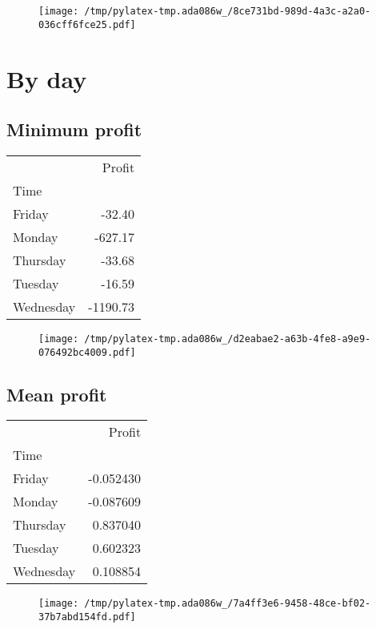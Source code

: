 \documentclass{article}%
\begin{document}
\begin{figure}[htbp]%
\centering%
\texttt{[image: /tmp/pylatex-tmp.ada086w\_/8ce731bd-989d-4a3c-a2a0-036cff6fce25.pdf]}%
\end{figure}

%
\newpage %
\section{By day}%
\label{sec:Byday}%
\subsection{Minimum profit }%
\label{subsec:Minimumprofit}%
\begin{tabular}{lr}
\toprule
{} &   Profit \\
Time      &          \\
\midrule
Friday    &   -32.40 \\
Monday    &  -627.17 \\
Thursday  &   -33.68 \\
Tuesday   &   -16.59 \\
Wednesday & -1190.73 \\
\bottomrule
\end{tabular}
%


\begin{figure}[htbp]%
\centering%
\texttt{[image: /tmp/pylatex-tmp.ada086w\_/d2eabae2-a63b-4fe8-a9e9-076492bc4009.pdf]}%
\end{figure}

%
\newpage %
\subsection{Mean profit }%
\label{subsec:Meanprofit}%
\begin{tabular}{lr}
\toprule
{} &    Profit \\
Time      &           \\
\midrule
Friday    & -0.052430 \\
Monday    & -0.087609 \\
Thursday  &  0.837040 \\
Tuesday   &  0.602323 \\
Wednesday &  0.108854 \\
\bottomrule
\end{tabular}
%


\begin{figure}[htbp]%
\centering%
\texttt{[image: /tmp/pylatex-tmp.ada086w\_/7a4ff3e6-9458-48ce-bf02-37b7abd154fd.pdf]}%
\end{figure}
\end{document}
